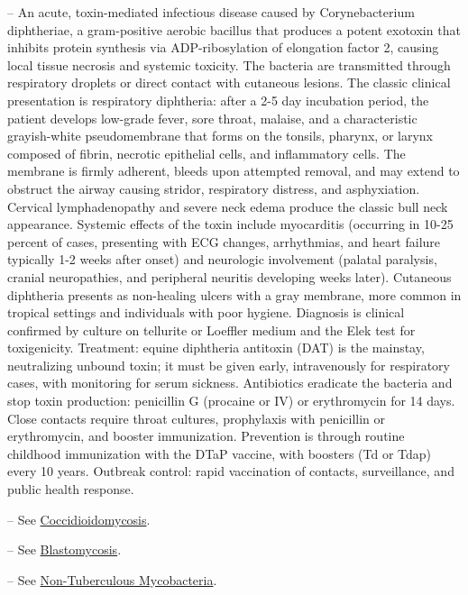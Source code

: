 -- An acute, toxin-mediated infectious disease caused by Corynebacterium diphtheriae, a gram-positive aerobic bacillus that produces a potent exotoxin that inhibits protein synthesis via ADP-ribosylation of elongation factor 2, causing local tissue necrosis and systemic toxicity. The bacteria are transmitted through respiratory droplets or direct contact with cutaneous lesions. The classic clinical presentation is respiratory diphtheria: after a 2-5 day incubation period, the patient develops low-grade fever, sore throat, malaise, and a characteristic grayish-white pseudomembrane that forms on the tonsils, pharynx, or larynx composed of fibrin, necrotic epithelial cells, and inflammatory cells. The membrane is firmly adherent, bleeds upon attempted removal, and may extend to obstruct the airway causing stridor, respiratory distress, and asphyxiation. Cervical lymphadenopathy and severe neck edema produce the classic bull neck appearance. Systemic effects of the toxin include myocarditis (occurring in 10-25 percent of cases, presenting with ECG changes, arrhythmias, and heart failure typically 1-2 weeks after onset) and neurologic involvement (palatal paralysis, cranial neuropathies, and peripheral neuritis developing weeks later). Cutaneous diphtheria presents as non-healing ulcers with a gray membrane, more common in tropical settings and individuals with poor hygiene. Diagnosis is clinical confirmed by culture on tellurite or Loeffler medium and the Elek test for toxigenicity. Treatment: equine diphtheria antitoxin (DAT) is the mainstay, neutralizing unbound toxin; it must be given early, intravenously for respiratory cases, with monitoring for serum sickness. Antibiotics eradicate the bacteria and stop toxin production: penicillin G (procaine or IV) or erythromycin for 14 days. Close contacts require throat cultures, prophylaxis with penicillin or erythromycin, and booster immunization. Prevention is through routine childhood immunization with the DTaP vaccine, with boosters (Td or Tdap) every 10 years. Outbreak control: rapid vaccination of contacts, surveillance, and public health response.

-- See \hyperlink{Coccidioidomycosis}{Coccidioidomycosis}.

-- See \hyperlink{Blastomycosis}{Blastomycosis}.

-- See \hyperlink{Non-Tuberculous Mycobacteria}{Non-Tuberculous Mycobacteria}.

